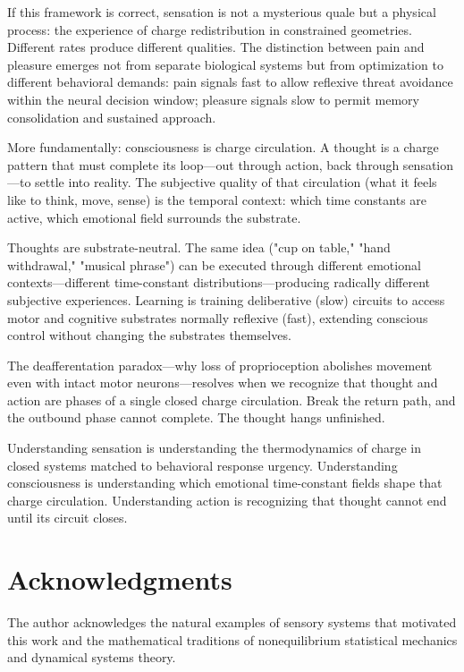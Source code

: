 \documentclass[twocolumn,10pt]{article}
\theoremstyle{remark}
\begin{document}
If this framework is correct, sensation is not a mysterious quale but a physical process: the experience of charge redistribution in constrained geometries. Different rates produce different qualities. The distinction between pain and pleasure emerges not from separate biological systems but from optimization to different behavioral demands: pain signals fast to allow reflexive threat avoidance within the neural decision window; pleasure signals slow to permit memory consolidation and sustained approach.

More fundamentally: consciousness is charge circulation. A thought is a charge pattern that must complete its loop—out through action, back through sensation—to settle into reality. The subjective quality of that circulation (what it feels like to think, move, sense) is the temporal context: which time constants are active, which emotional field surrounds the substrate.

Thoughts are substrate-neutral. The same idea ("cup on table," "hand withdrawal," "musical phrase") can be executed through different emotional contexts—different time-constant distributions—producing radically different subjective experiences. Learning is training deliberative (slow) circuits to access motor and cognitive substrates normally reflexive (fast), extending conscious control without changing the substrates themselves.

The deafferentation paradox—why loss of proprioception abolishes movement even with intact motor neurons—resolves when we recognize that thought and action are phases of a single closed charge circulation. Break the return path, and the outbound phase cannot complete. The thought hangs unfinished.

Understanding sensation is understanding the thermodynamics of charge in closed systems matched to behavioral response urgency. Understanding consciousness is understanding which emotional time-constant fields shape that charge circulation. Understanding action is recognizing that thought cannot end until its circuit closes.

\section*{Acknowledgments}

The author acknowledges the natural examples of sensory systems that motivated this work and the mathematical traditions of nonequilibrium statistical mechanics and dynamical systems theory.



\end{document}
